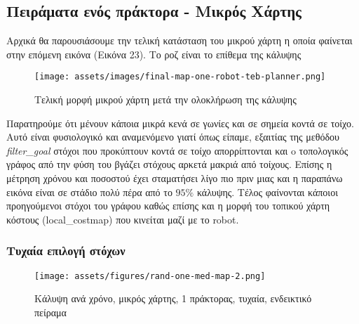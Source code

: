 




\subsection{Πειράματα ενός πράκτορα - Μικρός Χάρτης}

Αρχικά θα παρουσιάσουμε την τελική κατάσταση του μικρού χάρτη η οποία φαίνεται στην επόμενη εικόνα (Εικόνα 23). Το ροζ είναι το επίθεμα της κάλυψης

\begin{figure}[!h]
	\centering
	\texttt{[image: assets/images/final-map-one-robot-teb-planner.png]}
	\caption{Τελική μορφή μικρού χάρτη μετά την ολοκλήρωση της κάλυψης}
	\label{fig:target at cov limits}
\end{figure}

Παρατηρούμε ότι μένουν κάποια μικρά κενά σε γωνίες και σε σημεία κοντά σε τοίχο. Αυτό είναι φυσιολογικό και αναμενόμενο γιατί όπως είπαμε, εξαιτίας της μεθόδου \textit{filter\_goal} στόχοι που προκύπτουν κοντά σε τοίχο απορρίπτονται και o τοπολογικός γράφος από την φύση του βγάζει στόχους αρκετά μακριά από τοίχους. Επίσης η μέτρηση χρόνου και ποσοστού έχει σταματήσει λίγο πιο πριν μιας και η παραπάνω εικόνα είναι σε στάδιο πολύ πέρα από το $ 95\% $ κάλυψης. Τέλος φαίνονται κάποιοι προηγούμενοι στόχοι του γράφου καθώς επίσης και η μορφή του τοπικού χάρτη κόστους (local\_costmap) που κινείται μαζί με το robot. 

\newpage
\subsubsection{Τυχαία επιλογή στόχων}



\begin{figure}[!h]
	\centering
	\texttt{[image: assets/figures/rand-one-med-map-2.png]}
	\caption{Κάλυψη ανά χρόνο, μικρός χάρτης, 1 πράκτορας, τυχαία, ενδεικτικό πείραμα}
\end{figure}

